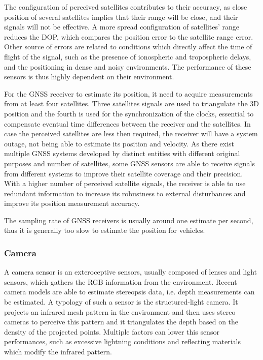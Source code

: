The configuration of perceived satellites contributes to their accuracy, as close position of several satellites implies that their range will be close, and their signals will not be effective.
A more spread configuration of satellites' range reduces the \gls{DOP}, which compares the position error to the satellite range error.
Other source of errors are related to conditions which directly affect the time of flight of the signal, such as the presence of ionospheric and tropospheric delays, and the positioning in dense and noisy environments.
The performance of these sensors is thus highly dependent on their environment.

For the \gls{GNSS} receiver to estimate its position, it need to acquire measurements from at least four satellites.
Three satellites signals are used to triangulate the \gls{3D} position and the fourth is used for the synchronization of the clocks, essential to compensate eventual time differences between the receiver and the satellites.
In case the perceived satellites are less then required, the receiver will have a system outage, not being able to estimate its position and velocity.
As there exist multiple \gls{GNSS} systems developed by distinct entities with different original purposes and number of satellites, some \gls{GNSS} sensors are able to receive signals from different systems to improve their satellite coverage and their precision.
With a higher number of perceived satellite signals, the receiver is able to use redundant information to increase its robustness to external disturbances and improve its position measurement accuracy.

The sampling rate of \gls{GNSS} receivers is usually around one estimate per second, thus it is generally too slow to estimate the position for vehicles. 


\subsubsection{Camera}

\noindent A camera sensor is an exteroceptive sensors, usually composed of lenses and light sensors, which gathers the \gls{RGB} information from the environment.
Recent camera models are able to estimate stereopsis data, i.e. depth measurements can be estimated. 
A typology of such a sensor is the structured-light camera. It projects an infrared mesh pattern in the environment and then uses stereo cameras to perceive this pattern and it triangulates the depth based on the density of the projected points.
Multiple factors can lower this sensor performances, such as excessive lightning conditions and reflecting materials which modify the infrared pattern.

